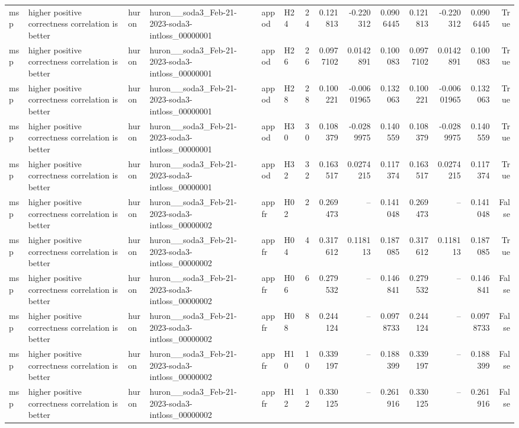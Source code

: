 \begin{longtable}{llllllrrrrrrrr}
msp & higher positive correctness correlation is better & huron & huron\_\_soda3\_Feb-21-2023-soda3-intloss\_00000001 & appod & H24 & 24 & 0.121813 & -0.220312 & 0.0906445 & 0.121813 & -0.220312 & 0.0906445 & True \\
msp & higher positive correctness correlation is better & huron & huron\_\_soda3\_Feb-21-2023-soda3-intloss\_00000001 & appod & H26 & 26 & 0.0977102 & 0.0142891 & 0.100083 & 0.0977102 & 0.0142891 & 0.100083 & True \\
msp & higher positive correctness correlation is better & huron & huron\_\_soda3\_Feb-21-2023-soda3-intloss\_00000001 & appod & H28 & 28 & 0.100221 & -0.00601965 & 0.132063 & 0.100221 & -0.00601965 & 0.132063 & True \\
msp & higher positive correctness correlation is better & huron & huron\_\_soda3\_Feb-21-2023-soda3-intloss\_00000001 & appod & H30 & 30 & 0.108379 & -0.0289975 & 0.140559 & 0.108379 & -0.0289975 & 0.140559 & True \\
msp & higher positive correctness correlation is better & huron & huron\_\_soda3\_Feb-21-2023-soda3-intloss\_00000001 & appod & H32 & 32 & 0.163517 & 0.0274215 & 0.117374 & 0.163517 & 0.0274215 & 0.117374 & True \\
msp & higher positive correctness correlation is better & huron & huron\_\_soda3\_Feb-21-2023-soda3-intloss\_00000002 & appfr & H02 & 2 & 0.269473 & -- & 0.141048 & 0.269473 & -- & 0.141048 & False \\
msp & higher positive correctness correlation is better & huron & huron\_\_soda3\_Feb-21-2023-soda3-intloss\_00000002 & appfr & H04 & 4 & 0.317612 & 0.118113 & 0.187085 & 0.317612 & 0.118113 & 0.187085 & True \\
msp & higher positive correctness correlation is better & huron & huron\_\_soda3\_Feb-21-2023-soda3-intloss\_00000002 & appfr & H06 & 6 & 0.279532 & -- & 0.146841 & 0.279532 & -- & 0.146841 & False \\
msp & higher positive correctness correlation is better & huron & huron\_\_soda3\_Feb-21-2023-soda3-intloss\_00000002 & appfr & H08 & 8 & 0.244124 & -- & 0.0978733 & 0.244124 & -- & 0.0978733 & False \\
msp & higher positive correctness correlation is better & huron & huron\_\_soda3\_Feb-21-2023-soda3-intloss\_00000002 & appfr & H10 & 10 & 0.339197 & -- & 0.188399 & 0.339197 & -- & 0.188399 & False \\
msp & higher positive correctness correlation is better & huron & huron\_\_soda3\_Feb-21-2023-soda3-intloss\_00000002 & appfr & H12 & 12 & 0.330125 & -- & 0.261916 & 0.330125 & -- & 0.261916 & False \\

\end{longtable}
